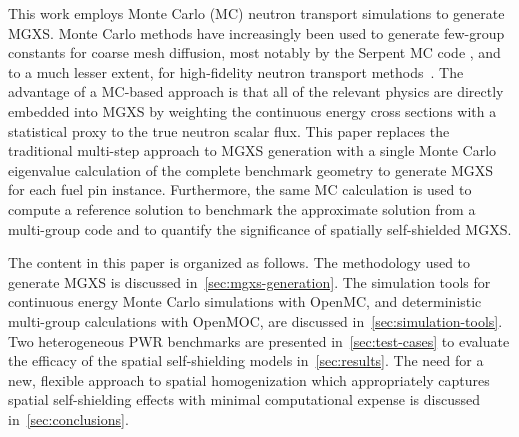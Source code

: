 This work employs Monte Carlo (MC) neutron transport simulations to generate MGXS. Monte Carlo methods have increasingly been used to generate few-group constants for coarse mesh diffusion, most notably by the Serpent MC code \citep{serpent2013manual}, and to a much lesser extent, for high-fidelity neutron transport methods~\citep{redmond1997multigroup, nelson2014improved, cai2014condensation, boyd2016thesis}. The advantage of a MC-based approach is that all of the relevant physics are directly embedded into MGXS by weighting the continuous energy cross sections with a statistical proxy to the true neutron scalar flux. This paper replaces the traditional multi-step approach to MGXS generation with a single Monte Carlo eigenvalue calculation of the complete benchmark geometry to generate MGXS for each fuel pin instance. Furthermore, the same MC calculation is used to compute a reference solution to benchmark the approximate solution from a multi-group code and to quantify the significance of spatially self-shielded MGXS.

The content in this paper is organized as follows. The methodology used to generate MGXS is discussed in~\autoref{sec:mgxs-generation}. The simulation tools for continuous energy Monte Carlo simulations with OpenMC, and deterministic multi-group calculations with OpenMOC, are discussed in~\autoref{sec:simulation-tools}. Two heterogeneous PWR benchmarks are presented in~\autoref{sec:test-cases} to evaluate the efficacy of the spatial self-shielding models in~\autoref{sec:results}. The need for a new, flexible approach to spatial homogenization which appropriately captures spatial self-shielding effects with minimal computational expense is discussed in~\autoref{sec:conclusions}.